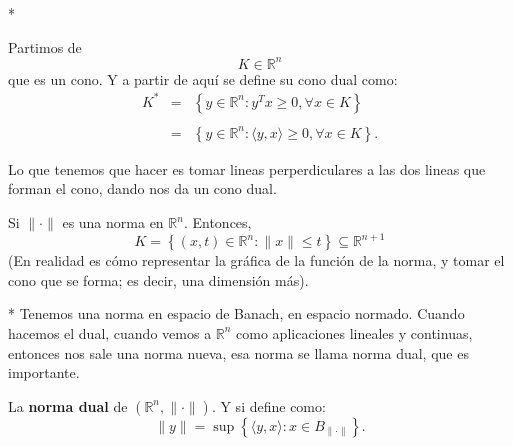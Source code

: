 \begin{paracol}{2}
\switchcolumn[1]*{\noindent\scriptsize
\begin{center}
\end{center}
}
\switchcolumn[0]
Partimos de 
$$K\in \mathbb{R}^n$$
que es un cono. Y a partir de aquí se define su cono dual como:
$$
\begin{array}{rcl}
    K^*&=&\left\{y\in \mathbb{R}^n: y^T x\geq 0,\forall x\in K\right\}\\\\
       &=&\left\{y\in \mathbb{R}^n: \langle y,x\rangle\geq 0,\forall x\in K\right\}.
\end{array}
$$

Lo que tenemos que hacer es tomar lineas perperdiculares a las dos lineas que forman el cono, dando nos da un cono dual. 

\begin{ejem}
    Si $\|\cdot\|$ es una norma en $\mathbb{R}^n$. Entonces,
    $$K=\left\{(x,t)\in \mathbb{R}^n:\|x\|\leq t\right\}\subseteq \mathbb{R}^{n+1}$$
    (En realidad es cómo representar la gráfica de la función de la norma, y tomar el cono que se forma; es decir, una dimensión más).
\end{ejem}

\switchcolumn[1]*{\noindent\scriptsize
    Tenemos una norma en espacio de Banach, en espacio normado. Cuando hacemos el dual, cuando vemos a $\mathbb{R}^n$ como aplicaciones lineales y continuas, entonces nos sale una norma nueva, esa norma se llama norma dual, que es importante.
}
\switchcolumn[0]\noindent
\begin{def.}
    La \textbf{norma dual} de $\left(\mathbb{R}^n,\|\cdot\|\right)$. Y si define como:
    $$\|y\| = \sup\left\{\langle y,x\rangle: x\in B_{\|\cdot\|}\right\}.$$
\end{def.}


\end{paracol}
